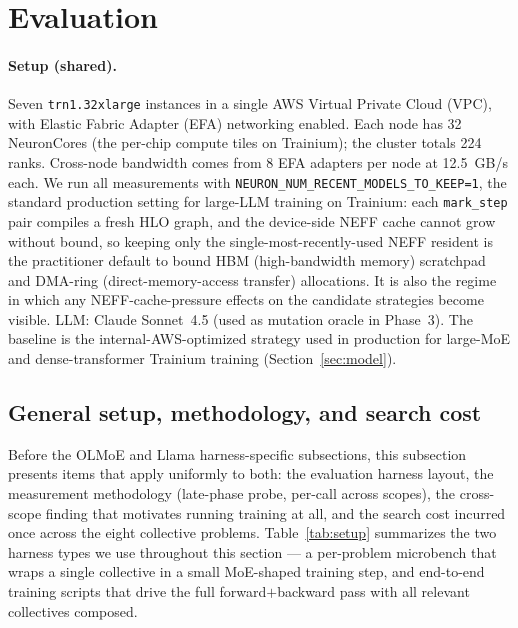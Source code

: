 \section{Evaluation}
\label{sec:eval}

\paragraph{Setup (shared).} Seven \texttt{trn1.32xlarge} instances
in a single AWS Virtual Private Cloud (VPC), with Elastic Fabric
Adapter (EFA) networking enabled. Each node has 32 NeuronCores
(the per-chip compute tiles on Trainium); the cluster totals 224
ranks. Cross-node bandwidth comes from 8 EFA adapters per node at
12.5~GB/s each. We run all measurements with
\texttt{NEURON\_NUM\_RECENT\_MODELS\_TO\_KEEP=1}, the standard
production setting for large-LLM training on Trainium: each
\texttt{mark\_step} pair compiles a fresh HLO graph, and the
device-side NEFF
cache cannot grow without bound, so keeping only the
single-most-recently-used NEFF resident is the practitioner default
to bound HBM (high-bandwidth memory) scratchpad and DMA-ring
(direct-memory-access transfer) allocations. It is also the regime
in which any NEFF-cache-pressure effects on the candidate
strategies become visible. LLM: Claude Sonnet~4.5 (used as
mutation oracle in Phase~3). The baseline is the
internal-AWS-optimized strategy used in production for
large-MoE and dense-transformer Trainium training
(Section~\ref{sec:model}).

\subsection{General setup, methodology, and search cost}
\label{sec:eval-general}

Before the OLMoE and Llama harness-specific subsections, this
subsection presents items that apply uniformly to both: the
evaluation harness layout, the measurement methodology (late-phase
probe, per-call across scopes), the cross-scope finding that
motivates running training at all, and the search cost incurred
once across the eight collective problems. Table~\ref{tab:setup}
summarizes the two harness types we use throughout this section ---
a per-problem microbench that wraps a single collective in a small
MoE-shaped training step, and end-to-end training scripts that
drive the full forward$+$backward pass with all relevant
collectives composed.

